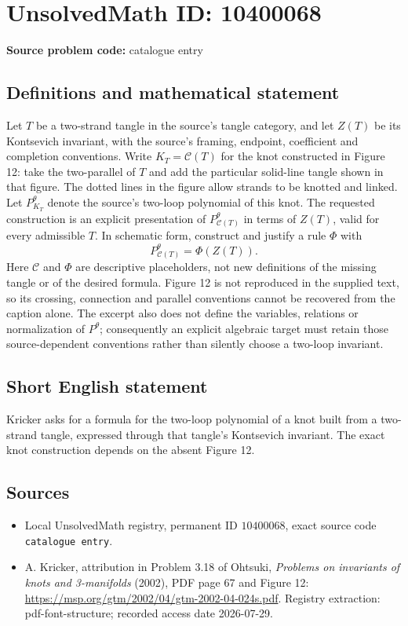 \documentclass[11pt]{article}
\begin{document}
\section*{UnsolvedMath ID: 10400068}
\textbf{Source problem code:} catalogue entry
\subsection{Definitions and mathematical statement}
Let \(T\) be a two-strand tangle in the source's tangle category, and let \(Z(T)\) be its Kontsevich invariant, with the source's framing, endpoint, coefficient and completion conventions. Write \(K_T=\mathcal C(T)\) for the knot constructed in Figure 12: take the two-parallel of \(T\) and add the particular solid-line tangle shown in that figure. The dotted lines in the figure allow strands to be knotted and linked. Let \(P^\theta_{K_T}\) denote the source's two-loop polynomial of this knot. The requested construction is an explicit presentation of \(P^\theta_{\mathcal C(T)}\) in terms of \(Z(T)\), valid for every admissible \(T\). In schematic form, construct and justify a rule \(\Phi\) with \[ P^\theta_{\mathcal C(T)}=\Phi(Z(T)). \] Here \(\mathcal C\) and \(\Phi\) are descriptive placeholders, not new definitions of the missing tangle or of the desired formula. Figure 12 is not reproduced in the supplied text, so its crossing, connection and parallel conventions cannot be recovered from the caption alone. The excerpt also does not define the variables, relations or normalization of \(P^\theta\); consequently an explicit algebraic target must retain those source-dependent conventions rather than silently choose a two-loop invariant.
\subsection{Short English statement}
Kricker asks for a formula for the two-loop polynomial of a knot built from a two-strand tangle, expressed through that tangle's Kontsevich invariant. The exact knot construction depends on the absent Figure 12.
\subsection{Sources}
\begin{itemize}
\item Local UnsolvedMath registry, permanent ID \(10400068\), exact source code \texttt{catalogue entry}.
\item A. Kricker, attribution in Problem 3.18 of Ohtsuki, \emph{Problems on invariants of knots and 3-manifolds} (2002), PDF page 67 and Figure 12: \url{https://msp.org/gtm/2002/04/gtm-2002-04-024s.pdf}. Registry extraction: pdf-font-structure; recorded access date 2026-07-29.
\end{itemize}
\end{document}
